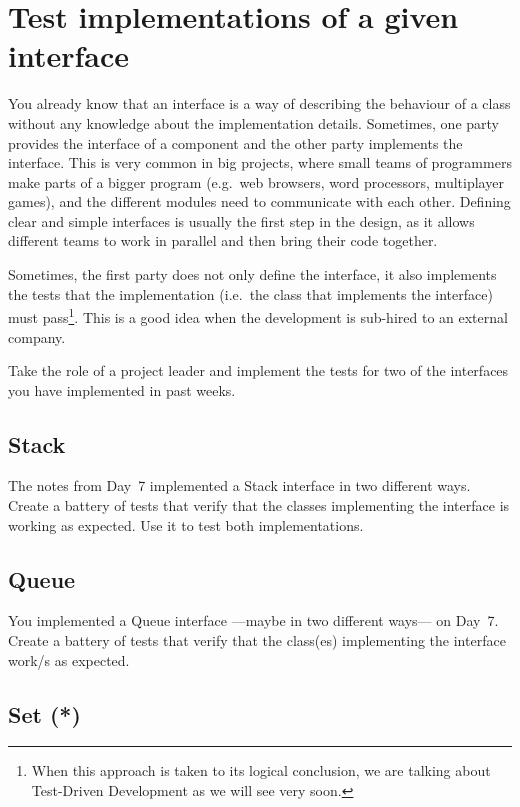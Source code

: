 \documentclass{article}
\begin{document}
\section{Test implementations of a given interface}
\label{sec:test-impl-given}

You already know that an interface is a way of describing the
behaviour of a class without any knowledge about the implementation 
details. Sometimes, one
party provides the interface of a component and the other party
implements the interface. This is very common in big projects, where
small teams of programmers make parts of a bigger program (e.g.~web
browsers, word processors, multiplayer games), and the different
modules need to communicate with each other. Defining clear and simple
interfaces is usually the first step in the design, as it allows
different teams to work in parallel and then bring their code
together. 

Sometimes, the first party does not only define the interface, it also
implements the tests that the implementation (i.e.~the class that
implements the interface) must pass\footnote{When this approach is taken to
its logical conclusion, we are talking about Test-Driven Development
as we will see very soon.}. This is a good idea when the development is
sub-hired to an external company. 

Take the role of a project leader and implement the tests for two of
the interfaces you have implemented in past weeks. 

\subsection{Stack}
\label{sec:stack3}

The notes from Day~7 implemented a Stack interface in two different
ways. Create a battery of tests that verify that the classes
implementing the interface is working as expected. Use it to test both
implementations.

\subsection{Queue}
\label{sec:stack2}

You implemented a Queue interface ---maybe in two different ways--- on
Day~7. Create a battery of tests that verify that the class(es)
implementing the interface work/s as expected. 

\subsection{Set (*)}
\label{sec:stack5}
\end{document}

